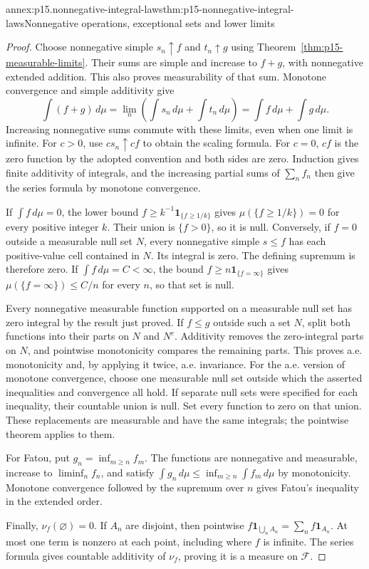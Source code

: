 \begin{annexitem}{annex:p15.nonnegative-integral-laws}{thm:p15-nonnegative-integral-laws}{Nonnegative operations, exceptional sets and lower limits}
\begin{proof}
Choose nonnegative simple \(s_n\uparrow f\) and \(t_n\uparrow g\)
using Theorem~\ref{thm:p15-measurable-limits}. Their sums are simple
and increase to \(f+g\), with nonnegative extended addition.
This also proves measurability of that sum. Monotone convergence and
simple additivity give
\[
 \int(f+g)\,d\mu
   =\lim_n\left(\int s_n\,d\mu+\int t_n\,d\mu\right)
   =\int f\,d\mu+\int g\,d\mu.
\]
Increasing nonnegative sums commute with these limits, even when one
limit is infinite. For \(c>0\), use \(cs_n\uparrow cf\) to
obtain the scaling formula. For \(c=0\), \(cf\) is the zero
function by the adopted convention and both sides are zero.
Induction gives finite additivity of integrals, and the increasing
partial sums of \(\sum_n f_n\) then give the series formula by
monotone convergence.

If \(\int f\,d\mu=0\), the lower bound
\(f\geq k^{-1}\mathbf1_{\{f\geq1/k\}}\) gives
\(\mu(\{f\geq1/k\})=0\) for every positive integer \(k\).
Their union is \(\{f>0\}\), so it is null. Conversely, if
\(f=0\) outside a measurable null set \(N\), every nonnegative
simple \(s\leq f\) has each positive-value cell contained in
\(N\). Its integral is zero. The defining supremum is therefore
zero. If \(\int f\,d\mu=C<\infty\), the bound
\(f\geq n\mathbf1_{\{f=\infty\}}\) gives
\(\mu(\{f=\infty\})\leq C/n\) for every \(n\), so that set
is null.

Every nonnegative measurable function supported on a measurable null
set has zero integral by the result just proved. If \(f\leq g\)
outside such a set \(N\), split both functions into their parts on
\(N\) and \(N^c\). Additivity removes the zero-integral parts on
\(N\), and pointwise monotonicity compares the remaining parts.
This proves a.e. monotonicity and, by applying it twice, a.e. invariance.
For the a.e. version of monotone convergence, choose one measurable
null set outside which the asserted inequalities and convergence all
hold. If separate null sets were specified for each inequality, their
countable union is null. Set every function to zero on that union.
These replacements are measurable and have the same integrals; the
pointwise theorem applies to them.

For Fatou, put \(g_n=\inf_{m\geq n}f_m\). The functions are
nonnegative and measurable, increase to \(\liminf_n f_n\), and
satisfy \(\int g_n\,d\mu\leq\inf_{m\geq n}\int f_m\,d\mu\)
by monotonicity. Monotone convergence followed by the supremum over
\(n\) gives Fatou's inequality in the extended order.

Finally, \(\nu_f(\varnothing)=0\). If \(A_n\) are disjoint,
then pointwise
\(f\mathbf1_{\bigcup_n A_n}=\sum_n f\mathbf1_{A_n}\).
At most one term is nonzero at each point, including where \(f\)
is infinite. The series formula gives countable additivity of
\(\nu_f\), proving it is a measure on \(\mathcal F\).
\end{proof}
\end{annexitem}

